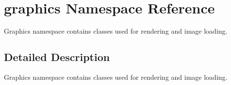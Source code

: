 \hypertarget{namespacegraphics}{}\section{graphics Namespace Reference}
\label{namespacegraphics}


Graphics namespace contains classes used for rendering and image loading.  




\subsection{Detailed Description}
Graphics namespace contains classes used for rendering and image loading. 

